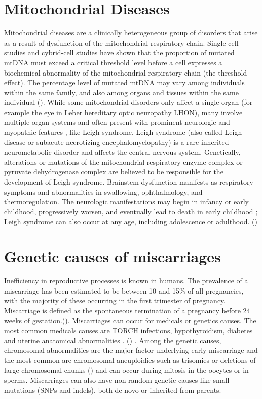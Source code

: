 \section{Mitochondrial Diseases}
Mitochondrial diseases are a clinically heterogeneous group of disorders that arise as a result of dysfunction of
the mitochondrial respiratory chain.
Single-cell studies and cybrid-cell studies have shown that the proportion of mutated mtDNA must exceed a critical threshold level before a cell expresses a biochemical abnormality of the mitochondrial respiratory chain (the threshold effect). The percentage level of mutated mtDNA may vary among individuals within the same family, and also among organs and tissues within the same individual (\cite{chinnery2014mitochondrial, thorburn2017mitochondrial}). 
While some mitochondrial disorders only affect a single organ (for example the eye in Leber hereditary optic neuropathy LHON), many involve multiple organ systems and often present with prominent neurologic and myopathic features , like Leigh syndrome.
Leigh syndrome (also called Leigh disease or subacute necrotizing
encephalomyelopathy) is a rare inherited neurometabolic disorder
and affects the central nervous system. 
Genetically, alterations or mutations of the mitochondrial respiratory enzyme complex or pyruvate dehydrogenase complex are believed to be responsible for the development of Leigh syndrome.
Brainstem dysfunction manifests as respiratory symptoms and abnormalities in swallowing, ophthalmology, and thermoregulation. 
The neurologic manifestations may begin in infancy or early
childhood, progressively worsen, and eventually lead to death in
early childhood ; Leigh syndrome can also occur at any age, including adolescence or adulthood.
(\cite{chang2020meta})


\section{Genetic causes of miscarriages}
Inefficiency in reproductive processes is known in humans. The prevalence of a miscarriage has been estimated to be between 10 and 15\% of all pregnancies, with the majority of these occurring in the first trimester of pregnancy.
Miscarriage is defined as the spontaneous termination of a pregnancy before 24 weeks of gestation.(\cite{larsen2013new, goddijn2000genetic}).
Miscarriages can occur for medicals or genetics causes. The most common medicals causes are TORCH infections, hypothyroidism,  diabetes and  uterine  anatomical  abnormalities . (\cite{najafi2019chromosomal}) . Among the genetic causes, chromosomal abnormalities are the major factor underlying early miscarriage and the most common are chromosomal aneuploidies such as trisomies or deletions of large chromosomal chunks (\cite{zhang2009genetic}) and can occur during mitosis in the oocytes or in sperms. Miscarriages can also have non random genetic causes like small mutations (SNPs and indels), both de-novo or inherited from parents.

